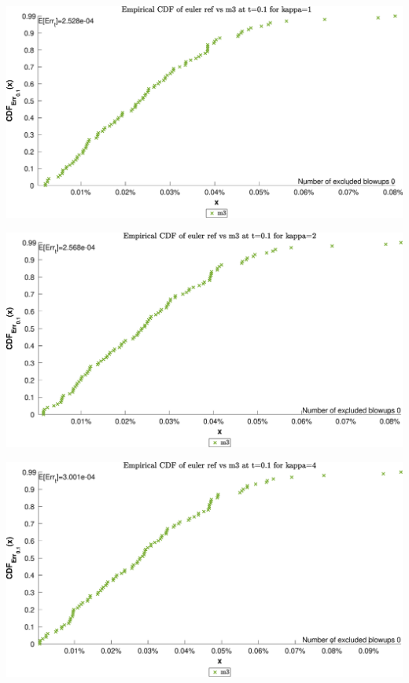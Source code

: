 \begin{landscape}
\includegraphics[width=.95\columnwidth]{CDF/CDFEulerRef_34}
\end{landscape}
\begin{landscape}
\includegraphics[width=.95\columnwidth]{CDF/CDFEulerRef_35}
\end{landscape}
\begin{landscape}
\includegraphics[width=.95\columnwidth]{CDF/CDFEulerRef_36}
\end{landscape}
